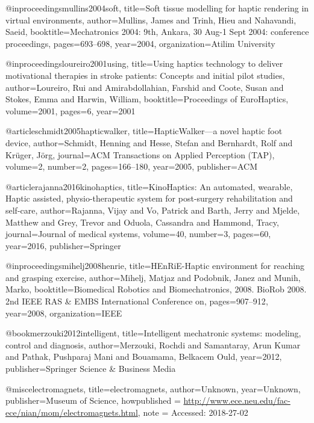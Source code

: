 @inproceedings{mullins2004soft,
  title={Soft tissue modelling for haptic rendering in virtual environments},
  author={Mullins, James and Trinh, Hieu and Nahavandi, Saeid},
  booktitle={Mechatronics 2004: 9th, Ankara, 30 Aug-1 Sept 2004: conference proceedings},
  pages={693--698},
  year={2004},
  organization={Atilim University}
}

@inproceedings{loureiro2001using,
  title={Using haptics technology to deliver motivational therapies in stroke patients: Concepts and initial pilot studies},
  author={Loureiro, Rui and Amirabdollahian, Farshid and Coote, Susan and Stokes, Emma and Harwin, William},
  booktitle={Proceedings of EuroHaptics},
  volume={2001},
  pages={6},
  year={2001}
}

@article{schmidt2005hapticwalker,
  title={HapticWalker---a novel haptic foot device},
  author={Schmidt, Henning and Hesse, Stefan and Bernhardt, Rolf and Kr{\"u}ger, J{\"o}rg},
  journal={ACM Transactions on Applied Perception (TAP)},
  volume={2},
  number={2},
  pages={166--180},
  year={2005},
  publisher={ACM}
}

@article{rajanna2016kinohaptics,
  title={KinoHaptics: An automated, wearable, Haptic assisted, physio-therapeutic system for post-surgery rehabilitation and self-care},
  author={Rajanna, Vijay and Vo, Patrick and Barth, Jerry and Mjelde, Matthew and Grey, Trevor and Oduola, Cassandra and Hammond, Tracy},
  journal={Journal of medical systems},
  volume={40},
  number={3},
  pages={60},
  year={2016},
  publisher={Springer}
}

@inproceedings{mihelj2008henrie,
  title={HEnRiE-Haptic environment for reaching and grasping exercise},
  author={Mihelj, Matjaz and Podobnik, Janez and Munih, Marko},
  booktitle={Biomedical Robotics and Biomechatronics, 2008. BioRob 2008. 2nd IEEE RAS \& EMBS International Conference on},
  pages={907--912},
  year={2008},
  organization={IEEE}
}

@book{merzouki2012intelligent,
  title={Intelligent mechatronic systems: modeling, control and diagnosis},
  author={Merzouki, Rochdi and Samantaray, Arun Kumar and Pathak, Pushparaj Mani and Bouamama, Belkacem Ould},
  year={2012},
  publisher={Springer Science \& Business Media}
}

@misc{electromagnets,
  title={electromagnets},
  author={Unknown},
  year={Unknown},
  publisher={Museum of Science},
  howpublished = {\url{http://www.ece.neu.edu/fac-ece/nian/mom/electromagnets.html}},
  note = {Accessed: 2018-27-02}
}

